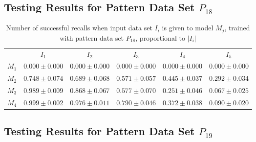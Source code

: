 \documentclass[anon]{CI}
\begin{document}
		\subsection{Testing Results for Pattern Data Set $P_{18}$}
		
		
		\begin{table}[H]
			\centering
			\def\arraystretch{1.5}
			\footnotesize
			\begin{tabular}{cccccc}
				
				& $I_{1}$  & $I_{2}$  & $I_{3}$  & $I_{4}$  & $I_{5}$ \\ \cline{2-6}
				$M_{1}$  & $0.000\pm0.000$  & $0.000\pm0.000$  & $0.000\pm0.000$  & $0.000\pm0.000$  & $0.000\pm0.000$ \\
				$M_{2}$  & $0.748\pm0.074$  & $0.689\pm0.068$  & $0.571\pm0.057$  & $0.445\pm0.037$  & $0.292\pm0.034$ \\
				$M_{3}$  & $0.989\pm0.009$  & $0.868\pm0.067$  & $0.577\pm0.070$  & $0.251\pm0.046$  & $0.067\pm0.025$ \\
				$M_{4}$  & $0.999\pm0.002$  & $0.976\pm0.011$  & $0.790\pm0.046$  & $0.372\pm0.038$  & $0.090\pm0.020$ \\
				
			\end{tabular}
			\caption{Number of successful recalls when input data set $I_i$ is given to model $M_j$, trained with pattern data set $P_{18}$, proportional to $\left|I_i\right|$}
		\end{table}
		
		\subsection{Testing Results for Pattern Data Set $P_{19}$}
		
		
\end{document}
